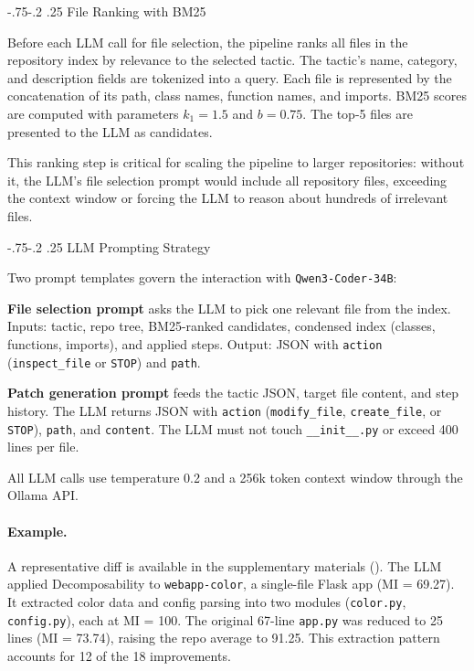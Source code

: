 \documentclass[sigconf,review,anonymous]{acmart}
\makeatletter
\renewcommand\subsubsection{\def\@toclevel{3}%
  \@startsection{subsubsection}{3}{\z@}%
  {-.75\baselineskip \@plus -2\p@ \@minus -.2\p@}%
  {.25\baselineskip}%
  {\ACM@NRadjust{\sffamily\bfseries\section@raggedright}}}
\makeatother
\begin{document}
\subsubsection{File Ranking with BM25}

Before each LLM call for file selection, the pipeline ranks all files in the repository index by relevance to the selected tactic. The tactic's name, category, and description fields are tokenized into a query. Each file is represented by the concatenation of its path, class names, function names, and imports. BM25 scores are computed with parameters $k_1 = 1.5$ and $b = 0.75$. The top-5 files are presented to the LLM as candidates.

This ranking step is critical for scaling the pipeline to larger repositories: without it, the LLM's file selection prompt would include all repository files, exceeding the context window or forcing the LLM to reason about hundreds of irrelevant files.

\subsubsection{LLM Prompting Strategy}

Two prompt templates govern the interaction with \texttt{Qwen3-Coder-34B}:

\textbf{File selection prompt} asks the LLM to pick one relevant file from the index. Inputs: tactic, repo tree, BM25-ranked candidates, condensed index (classes, functions, imports), and applied steps. Output: JSON with \texttt{action} (\texttt{inspect\_file} or \texttt{STOP}) and \texttt{path}.

\textbf{Patch generation prompt} feeds the tactic JSON, target file content, and step history. The LLM returns JSON with \texttt{action} (\texttt{modify\_file}, \texttt{create\_file}, or \texttt{STOP}), \texttt{path}, and \texttt{content}. The LLM must not touch \texttt{\_\_init\_\_.py} or exceed 400 lines per file.

All LLM calls use temperature 0.2 and a 256k token context window through the Ollama API.

\paragraph{Example.}
A representative diff is available in the supplementary materials (). The LLM applied Decomposability to \texttt{webapp-color}, a single-file Flask app (MI = 69.27). It extracted color data and config parsing into two modules (\texttt{color.py}, \texttt{config.py}), each at MI = 100. The original 67-line \texttt{app.py} was reduced to 25 lines (MI = 73.74), raising the repo average to 91.25. This extraction pattern accounts for 12 of the 18 improvements.
\end{document}
